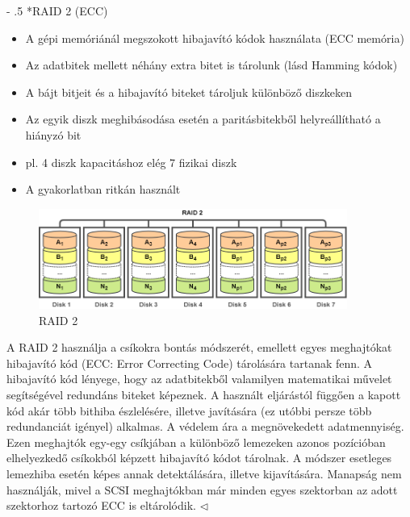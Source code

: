 \documentclass[tikz,12pt,margin=0px]{article}
\makeatletter
\renewcommand\paragraph{%
	\@startsection{paragraph}{4}{0mm}%
	{-\baselineskip}%
	{.5\baselineskip}%
	{\normalfont\normalsize\bfseries}}
\makeatother
\begin{document}
	\paragraph*{RAID 2 (ECC)}

    \begin{itemize}[topsep=8pt,itemsep=4pt,partopsep=4pt, parsep=4pt]
        \item A gépi memóriánál megszokott hibajavító kódok használata (ECC memória)
        \item Az adatbitek mellett néhány extra bitet is tárolunk (lásd Hamming kódok)
        \item A bájt bitjeit és a hibajavító biteket tároljuk különböző diszkeken
        \item Az egyik diszk meghibásodása esetén a paritásbitekből helyreállítható a hiányzó bit
        \item pl. 4 diszk kapacitáshoz elég 7 fizikai diszk
        \item A gyakorlatban ritkán használt
    \end{itemize}

    \begin{figure}[H]
        \centering
        \includegraphics[width=0.9\textwidth]{img/raid2.png}
        \caption{RAID 2}
        \label{ref:raid2}
    \end{figure}

    {\footnotesize \noindent {\color{blue} \faLightbulbO\ $\triangleright$ } }
    {\footnotesize
    \noindent A RAID 2 használja a csíkokra bontás módszerét, emellett egyes meghajtókat hibajavító kód (ECC: Error Correcting Code) tárolására tartanak fenn. A hibajavító kód lényege, hogy az adatbitekből valamilyen matematikai művelet segítségével redundáns biteket képeznek. A használt eljárástól függően a kapott kód akár több bithiba észlelésére, illetve javítására (ez utóbbi persze több redundanciát igényel) alkalmas. A védelem ára a megnövekedett adatmennyiség. Ezen meghajtók egy-egy csíkjában a különböző lemezeken azonos pozícióban elhelyezkedő csíkokból képzett hibajavító kódot tárolnak. A módszer esetleges lemezhiba esetén képes annak detektálására, illetve kijavítására. Manapság nem használják, mivel a SCSI meghajtókban már minden egyes szektorban az adott szektorhoz tartozó ECC is eltárolódik.
    $\triangleleft$ \faLightbulbO}\\
\end{document}

